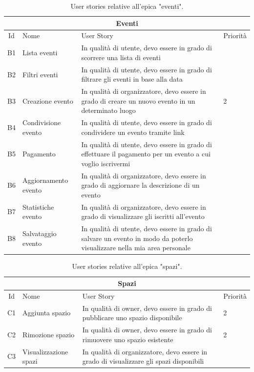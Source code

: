 \documentclass[9pt]{extarticle}
\begin{document}
\begin{table}[!htb]
	\centering
	\begin{tabular}{clp{7cm}l} %
		\toprule
		\multicolumn{4}{c}{\textbf{Eventi}}\\ \midrule
		Id & Nome & User Story & Priorità \\ \midrule
		B1  & Lista eventi            & In qualità di utente, devo essere in grado di scorrere una lista di eventi                                               &  \\
		B2  & Filtri eventi           & In qualità di utente, devo essere in grado di filtrare gli eventi in base alla data                                      &  \\
		B3  & Creazione evento        & In qualità di organizzatore, devo essere in grado di creare un nuovo evento in un determinato luogo                      &  2 \\
		B4  & Condivisione evento     & In qualità di utente, devo essere in grado di condividere un evento tramite link                                         &  \\
		B5  & Pagamento               & In qualità di utente, devo essere in grado di effettuare il pagamento per un evento a cui voglio iscrivermi              & \\
		B6  & Aggiornamento evento    & In qualità di organizzatore, devo essere in grado di aggiornare la descrizione di un evento                              & \\
		B7  & Statistiche evento      & In qualità di organizzatore, devo essere in grado di visualizzare gli iscritti all'evento                                & \\
		B8  & Salvataggio evento      & In qualità di utente, devo essere in grado di salvare un evento in modo da poterlo visualizzare nella mia area personale & \\
		\bottomrule
	\end{tabular}
	\caption{User stories relative all'epica "eventi".}
	\label{tab:eventi}
\end{table}

\begin{table}[!htb]
	\centering
	\begin{tabular}{clp{7cm}l} %
		\toprule
		\multicolumn{4}{c}{\textbf{Spazi}}\\ \midrule
		Id & Nome & User Story & Priorità \\ \midrule
		C1  & Aggiunta spazio  & In qualità di owner, devo essere in grado di pubblicare uno spazio disponibile & 2\\
		C2 & Rimozione spazio & In qualità di owner, devo essere in grado di rimuovere uno spazio esistente & 2\\
		C3 & Visualizzazione spazi & In qualità di organizzatore, devo essere in grado di visualizzare gli spazi disponibili & \\
		\bottomrule
	\end{tabular}
	\caption{User stories relative all'epica "spazi".}
	\label{tab:spazi}
\end{table}
\end{document}
